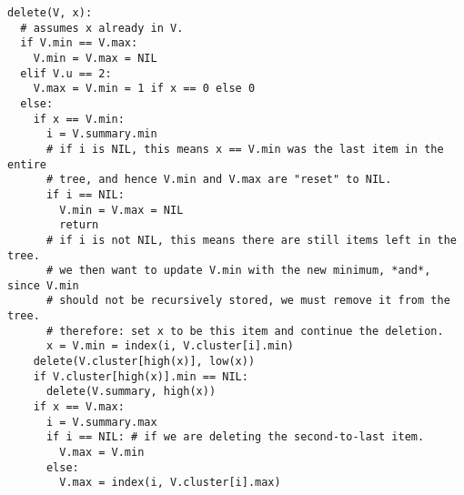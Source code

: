 \begin{verbatim}
delete(V, x):
  # assumes x already in V.
  if V.min == V.max:
    V.min = V.max = NIL
  elif V.u == 2:
    V.max = V.min = 1 if x == 0 else 0 
  else:
    if x == V.min:
      i = V.summary.min
      # if i is NIL, this means x == V.min was the last item in the entire
      # tree, and hence V.min and V.max are "reset" to NIL.
      if i == NIL:
        V.min = V.max = NIL
        return
      # if i is not NIL, this means there are still items left in the tree.
      # we then want to update V.min with the new minimum, *and*, since V.min
      # should not be recursively stored, we must remove it from the tree.
      # therefore: set x to be this item and continue the deletion.
      x = V.min = index(i, V.cluster[i].min)
    delete(V.cluster[high(x)], low(x))
    if V.cluster[high(x)].min == NIL:
      delete(V.summary, high(x))
    if x == V.max:
      i = V.summary.max
      if i == NIL: # if we are deleting the second-to-last item.
        V.max = V.min
      else:
        V.max = index(i, V.cluster[i].max)
\end{verbatim}


